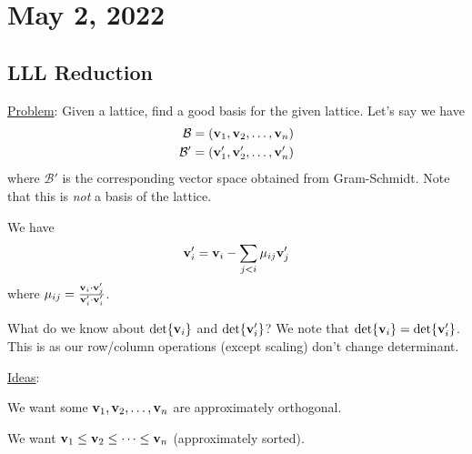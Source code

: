 \section{May 2, 2022}
\subsection{LLL Reduction}
\ul{Problem}: Given a lattice, find a good basis for the given lattice. Let's say we have
\begin{align*}
    \mathcal{B}  & = (\mathbf{v}_1, \mathbf{v}_2, \dots, \mathbf{v}_n)    \\
    \mathcal{B}' & = (\mathbf{v}_1', \mathbf{v}_2', \dots, \mathbf{v}_n')
\end{align*}
where $\mathcal{B}'$ is the corresponding vector space obtained from Gram-Schmidt. Note that this is \emph{not} a basis of the lattice.

We have
\[\mathbf{v}_i' = \mathbf{v}_i - \sum_{j < i}\mu_{ij}\mathbf{v}_j'\]
where $\mu_{ij} = \frac{\mathbf{v}_i\cdot \mathbf{v}_j'}{\mathbf{v}_i'\cdot\mathbf{v}_i'}$.

What do we know about $\det\{\mathbf{v}_i\}$ and $\det\{\mathbf{v}_i'\}$? We note that $\det\{\mathbf{v}_i\} = \det\{\mathbf{v}_i'\}$. This is as our row/column operations (except scaling) don't change determinant.

\ul{Ideas}:

We want some $\mathbf{v}_1, \mathbf{v}_2, \dots, \mathbf{v}_n$ are approximately orthogonal.

We want $\mathbf{v}_1 \leq \mathbf{v}_2 \leq \dots \leq \mathbf{v}_n$ (approximately sorted).

